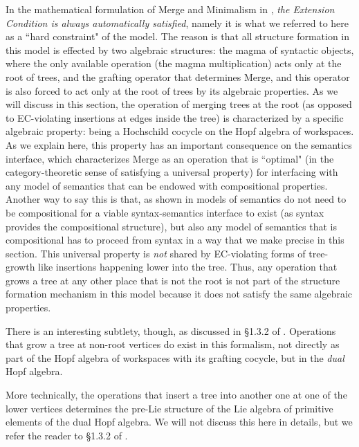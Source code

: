 \documentclass[12pt]{amsart}
\numberwithin{equation}{section}
\begin{document}
In the mathematical formulation of Merge and Minimalism in \cite{MCB},
{\em the Extension Condition is always automatically satisfied}, namely it is
what we referred to here as a ``hard constraint" of the model. The reason
is that all structure formation in this model is effected by two algebraic
structures: the magma of syntactic objects, where the only available operation
(the magma multiplication) acts only at the root of trees, and the
grafting operator that determines Merge, and this
operator is also forced to act only at the root of trees by
its algebraic properties. As we will discuss in this section, the operation
of merging trees at the root (as opposed to EC-violating insertions at
edges inside the tree) is characterized by a specific algebraic
property: being a Hochschild cocycle on the Hopf algebra of workspaces. 
As we explain here, this property has an important consequence on
the semantics interface, which characterizes Merge as an operation
that is ``optimal" (in the category-theoretic sense of satisfying a 
universal property) for interfacing with any model of semantics
that can be endowed with compositional properties. Another way
to say this is that, as shown in \cite{MCB} models of semantics do
not need to be compositional for a viable syntax-semantics interface
to exist (as syntax provides the compositional structure), but also
any model of semantics that is compositional has to proceed from
syntax in a way that we make precise in this section. This
universal property is {\em not} shared by EC-violating forms
of tree-growth like insertions happening lower into the tree. 
Thus, any operation that grows a tree at any other place that is not the root is not
part of the structure formation mechanism in this model because it does not
satisfy the same algebraic properties. 

\smallskip

There is an interesting subtlety, though, as discussed in \S 1.3.2 of \cite{MCB}.
Operations that grow a tree at non-root vertices do exist in this formalism, not directly
as part of the Hopf algebra of workspaces with its grafting cocycle, but in 
the {\em dual} Hopf algebra.

\smallskip

More technically, the operations that insert a tree into another one at one of 
the lower vertices determines the pre-Lie structure of the Lie algebra of 
primitive elements of the dual Hopf algebra. We will not discuss this here
in details, but we refer the reader to \S 1.3.2 of \cite{MCB}.
\end{document}
